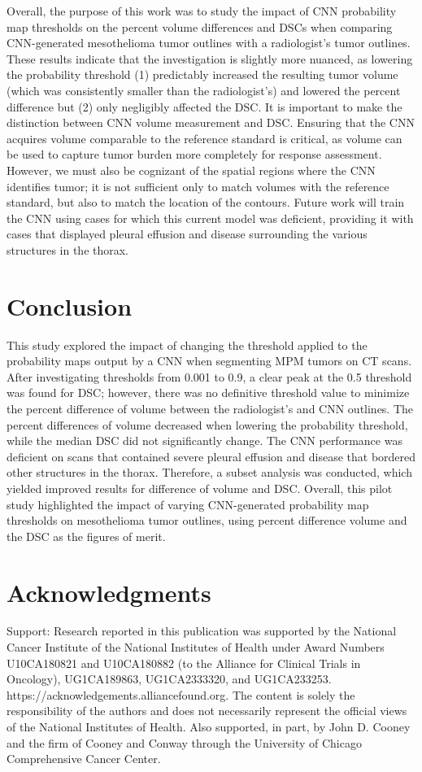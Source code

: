 \documentclass{article}
\begin{document}
Overall, the purpose of this work was to study the impact of CNN probability map thresholds on the percent volume differences and DSCs when comparing CNN-generated mesothelioma tumor outlines with a radiologist’s tumor outlines. These results indicate that the investigation is slightly more nuanced, as lowering the probability threshold (1) predictably increased the resulting tumor volume (which was consistently smaller than the radiologist’s) and lowered the percent difference but (2) only negligibly affected the DSC. It is important to make the distinction between CNN volume measurement and DSC. Ensuring that the CNN acquires volume comparable to the reference standard is critical, as volume can be used to capture tumor burden more completely for response assessment. However, we must also be cognizant of the spatial regions where the CNN identifies tumor; it is not sufficient only to match volumes with the reference standard, but also to match the location of the contours. Future work will train the CNN using cases for which this current model was deficient, providing it with cases that displayed pleural effusion and disease surrounding the various structures in the thorax. 

\section{Conclusion}
This study explored the impact of changing the threshold applied to the probability maps output by a CNN when segmenting MPM tumors on CT scans. After investigating thresholds from 0.001 to 0.9, a clear peak at the 0.5 threshold was found for DSC; however, there was no definitive threshold value to minimize the percent difference of volume between the radiologist’s and CNN outlines. The percent differences of volume decreased when lowering the probability threshold, while the median DSC did not significantly change. The CNN performance was deficient on scans that contained severe pleural effusion and disease that bordered other structures in the thorax. Therefore, a subset analysis was conducted, which yielded improved results for difference of volume and DSC. Overall, this pilot study highlighted the impact of varying CNN-generated probability map thresholds on mesothelioma tumor outlines, using percent difference volume and the DSC as the figures of merit.

\section*{Acknowledgments}
Support: Research reported in this publication was supported by the National Cancer Institute of the National Institutes of Health under Award Numbers U10CA180821 and U10CA180882 (to the Alliance for Clinical Trials in Oncology), UG1CA189863, UG1CA2333320, and UG1CA233253. https://acknowledgements.alliancefound.org. The content is solely the responsibility of the authors and does not necessarily represent the official views of the National Institutes of Health. Also supported, in part, by John D. Cooney and the firm of Cooney and Conway through the University of Chicago Comprehensive Cancer Center.
\end{document}

